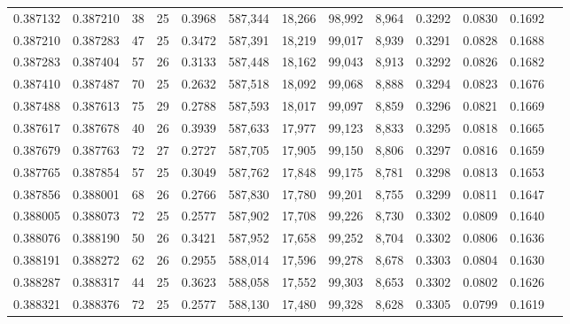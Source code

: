 \begin{tabular}{rrrrrrrrrrrrr}
0.387132 & 0.387210 &    38 &  25 &                                     0.3968 & 587,344 &  18,266 &  98,992 &   8,964 & 0.3292 & 0.0830 & 0.1692 \\
0.387210 & 0.387283 &    47 &  25 &                                     0.3472 & 587,391 &  18,219 &  99,017 &   8,939 & 0.3291 & 0.0828 & 0.1688 \\
0.387283 & 0.387404 &    57 &  26 &                                     0.3133 & 587,448 &  18,162 &  99,043 &   8,913 & 0.3292 & 0.0826 & 0.1682 \\
0.387410 & 0.387487 &    70 &  25 &                                     0.2632 & 587,518 &  18,092 &  99,068 &   8,888 & 0.3294 & 0.0823 & 0.1676 \\
0.387488 & 0.387613 &    75 &  29 &                                     0.2788 & 587,593 &  18,017 &  99,097 &   8,859 & 0.3296 & 0.0821 & 0.1669 \\
0.387617 & 0.387678 &    40 &  26 &                                     0.3939 & 587,633 &  17,977 &  99,123 &   8,833 & 0.3295 & 0.0818 & 0.1665 \\
0.387679 & 0.387763 &    72 &  27 &                                     0.2727 & 587,705 &  17,905 &  99,150 &   8,806 & 0.3297 & 0.0816 & 0.1659 \\
0.387765 & 0.387854 &    57 &  25 &                                     0.3049 & 587,762 &  17,848 &  99,175 &   8,781 & 0.3298 & 0.0813 & 0.1653 \\
0.387856 & 0.388001 &    68 &  26 &                                     0.2766 & 587,830 &  17,780 &  99,201 &   8,755 & 0.3299 & 0.0811 & 0.1647 \\
0.388005 & 0.388073 &    72 &  25 &                                     0.2577 & 587,902 &  17,708 &  99,226 &   8,730 & 0.3302 & 0.0809 & 0.1640 \\
0.388076 & 0.388190 &    50 &  26 &                                     0.3421 & 587,952 &  17,658 &  99,252 &   8,704 & 0.3302 & 0.0806 & 0.1636 \\
0.388191 & 0.388272 &    62 &  26 &                                     0.2955 & 588,014 &  17,596 &  99,278 &   8,678 & 0.3303 & 0.0804 & 0.1630 \\
0.388287 & 0.388317 &    44 &  25 &                                     0.3623 & 588,058 &  17,552 &  99,303 &   8,653 & 0.3302 & 0.0802 & 0.1626 \\
0.388321 & 0.388376 &    72 &  25 &                                     0.2577 & 588,130 &  17,480 &  99,328 &   8,628 & 0.3305 & 0.0799 & 0.1619 \\

\end{tabular}
